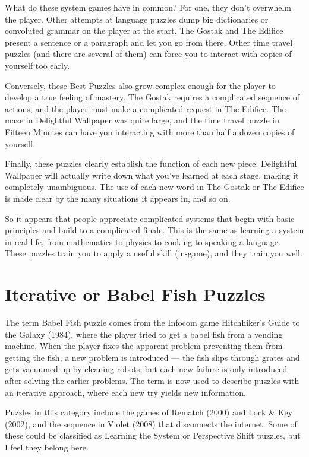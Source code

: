 What do these system games have in common? For one, they don’t overwhelm the player. Other attempts at language puzzles dump big dictionaries or convoluted grammar on the player at the start. The Gostak and The Edifice present a sentence or a paragraph and let you go from there. Other time travel puzzles (and there are several of them) can force you to interact with copies of yourself too early.

Conversely, these Best Puzzles also grow complex enough for the player to develop a true feeling of mastery. The Gostak requires a complicated sequence of actions, and the player must make a complicated request in The Edifice. The maze in Delightful Wallpaper was quite large, and the time travel puzzle in Fifteen Minutes can have you interacting with more than half a dozen copies of yourself.

Finally, these puzzles clearly establish the function of each new piece. Delightful Wallpaper will actually write down what you’ve learned at each stage, making it completely unambiguous. The use of each new word in The Gostak or The Edifice is made clear by the many situations it appears in, and so on.

So it appears that people appreciate complicated systems that begin with basic principles and build to a complicated finale. This is the same as learning a system in real life, from mathematics to physics to cooking to speaking a language. These puzzles train you to apply a useful skill (in-game), and they train you well.

\section{Iterative or Babel Fish Puzzles}

The term Babel Fish puzzle comes from the Infocom game Hitchhiker’s Guide to the Galaxy (1984), where the player tried to get a babel fish from a vending machine. When the player fixes the apparent problem preventing them from getting the fish, a new problem is introduced — the fish slips through grates and gets vacuumed up by cleaning robots, but each new failure is only introduced after solving the earlier problems. The term is now used to describe puzzles with an iterative approach, where each new try yields new information.

Puzzles in this category include the games of Rematch (2000) and Lock \& Key (2002), and the sequence in Violet (2008) that disconnects the internet. Some of these could be classified as Learning the System or Perspective Shift puzzles, but I feel they belong here.

